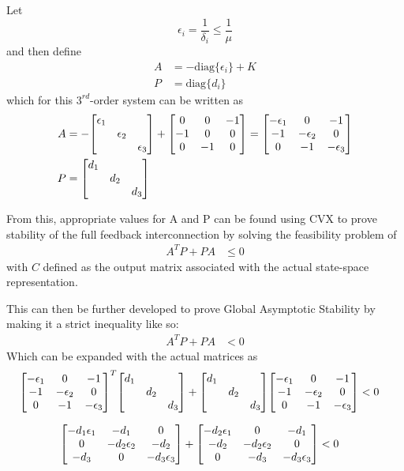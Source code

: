 \documentclass[letter]{article}
\begin{document}
Let $$\epsilon_i = \frac{1}{\delta_i} \leq \frac{1}{\mu}$$ and then define
\begin{align}
	A &= - \text{diag}\{\epsilon_i\} + K\\
	P &= \text{diag}\{d_i\}
\end{align}
which for this $3^{rd}$-order system can be written as
\begin{align}
	A &= -\mqty[\dmat{\epsilon_1}{\epsilon_2}{\epsilon_3}] + \mqty[0 & 0 &-1\\ -1 & 0 & 0\\ 0 &-1 & 0] 
	= \mqty[-\epsilon_1 & 0 &-1\\
			 -1 &-\epsilon_2 &0\\
			 0	&-1	&-\epsilon_3]\\
	P &= \mqty[\dmat{d_1}{d_2}{d_3}]
\end{align}

From this, appropriate values for A and P can be found using CVX to prove stability of the full feedback interconnection by solving the feasibility problem of
\begin{align}
	A^T P + P A &\leq 0
\end{align}
with $C$ defined as the output matrix associated with the actual state-space representation.

This can then be further developed to prove Global Asymptotic Stability by making it a strict inequality like so:
\begin{align}
	A^T P + P A &< 0
\end{align}
Which can be expanded with the actual matrices as
\begin{align}
	\mqty[-\epsilon_1 & 0 &-1\\
	-1 &-\epsilon_2 &0\\
	0	&-1	&-\epsilon_3]^T
	\mqty[\dmat{d_1}{d_2}{d_3}] +
	\mqty[\dmat{d_1}{d_2}{d_3}]
	\mqty[-\epsilon_1 & 0 &-1\\
	-1 &-\epsilon_2 &0\\
	0	&-1	&-\epsilon_3]
	&< 0
\end{align}

\begin{align}
	\mqty[-d_1\epsilon_1 & -d_1 &0\\
		0 &-d_2\epsilon_2 &-d_2\\
		-d_3	&0	&-d_3\epsilon_3]+
	\mqty[-d_2\epsilon_1 & 0 &-d_1\\
	-d_2 &-d_2\epsilon_2 &0\\
	0	&-d_3	&-d_3\epsilon_3]
	&< 0
\end{align}
\end{document}
